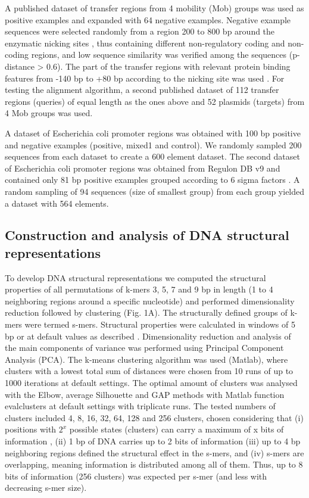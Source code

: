 \documentclass[10pt]{article}
\begin{document}
A published dataset of transfer regions from 4 mobility (Mob) groups \cite{Zrimec2018-lx} was used as positive examples and expanded with 64 negative examples. Negative example sequences were selected randomly from a region 200 to 800 bp around the enzymatic nicking sites \cite{Zrimec2018-lx}, thus containing different non-regulatory coding and non-coding regions, and low sequence similarity was verified among the sequences (p-distance \textgreater{} 0.6). The part of the transfer regions with relevant protein binding features from -140 bp to +80 bp according to the nicking site was used \cite{Zrimec2018-lx}. For testing the alignment algorithm, a second published dataset of 112 transfer regions (queries) of equal length as the ones above and 52 plasmids (targets) \cite{Zrimec2020-wx} from 4 Mob groups was used.

A dataset of Escherichia coli promoter regions was obtained \cite{Gusmao2014-hp} with 100 bp positive and negative examples (positive, mixed1 and control). We randomly sampled 200 sequences from each dataset to create a 600 element dataset. The second dataset of Escherichia coli promoter regions was obtained from Regulon DB v9 \cite{Gama-Castro2016-so} and contained only 81 bp positive examples grouped according to 6 sigma factors \cite{Watson2008-dt}. A random sampling of 94 sequences (size of smallest group) from each group yielded a dataset with 564 elements.

\subsection{Construction and analysis of DNA structural representations}
To develop DNA structural representations we computed the structural properties of all permutations of k-mers 3, 5, 7 and 9 bp in length (1 to 4 neighboring regions around a specific nucleotide) and performed dimensionality reduction followed by clustering (Fig. 1A). The structurally defined groups of k-mers were termed s-mers. Structural properties were calculated in windows of 5 bp or at default values as described \cite{Zrimec2015-xf,Zrimec2018-lx}. Dimensionality reduction and analysis of the main components of variance was performed using Principal Component Analysis (PCA). The k-means clustering algorithm was used (Matlab), where clusters with a lowest total sum of distances were chosen from 10 runs of up to 1000 iterations at default settings. The optimal amount of clusters was analysed with the Elbow, average Silhouette \cite{Rousseeuw1987-mx} and GAP \cite{Tibshirani2001-wq} methods with Matlab function evalclusters at default settings with triplicate runs. The tested numbers of clusters included 4, 8, 16, 32, 64, 128 and 256 clusters, chosen considering that (i) positions with $2^x$ possible states (clusters) can carry a maximum of x bits of information \cite{Schneider1986-iv}, (ii) 1 bp of DNA carries up to 2 bits of information (iii) up to 4 bp neighboring regions defined the structural effect in the s-mers, and (iv) s-mers are overlapping, meaning information is distributed among all of them. Thus, up to 8 bits of information (256 clusters) was expected per s-mer (and less with decreasing s-mer size). 
\end{document}
